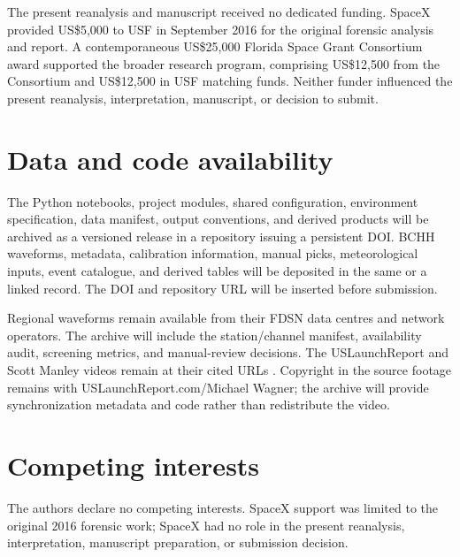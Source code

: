 \documentclass[]{seismica}
\begin{document}
The present reanalysis and manuscript received no dedicated funding. SpaceX
provided US\$5,000 to USF in September 2016 for the original forensic analysis
and report. A contemporaneous US\$25,000 Florida Space Grant Consortium award
supported the broader research program, comprising US\$12,500 from the
Consortium and US\$12,500 in USF matching funds. Neither funder influenced the
present reanalysis, interpretation, manuscript, or decision to submit.

\section*{Data and code availability}

The Python notebooks, project modules, shared configuration, environment
specification, data manifest, output conventions, and derived products will be
archived as a versioned release in a repository issuing a persistent DOI. BCHH
waveforms, metadata, calibration information, manual picks, meteorological
inputs, event catalogue, and derived tables will be deposited in the same or a
linked record. The DOI and repository URL will be inserted before submission.

Regional waveforms remain available from their FDSN data centres and network
operators. The archive will include the station/channel manifest, availability
audit, screening metrics, and manual-review decisions. The USLaunchReport and
Scott Manley videos remain at their cited URLs
\citep{uslaunchreport_amos6_video_2016,manley_spacex_explosion_2016}. Copyright
in the source footage remains with USLaunchReport.com/Michael Wagner; the
archive will provide synchronization metadata and code rather than redistribute
the video.

\section*{Competing interests}

The authors declare no competing interests. SpaceX support was limited to the
original 2016 forensic work; SpaceX had no role in the present reanalysis,
interpretation, manuscript preparation, or submission decision.


\end{document}
